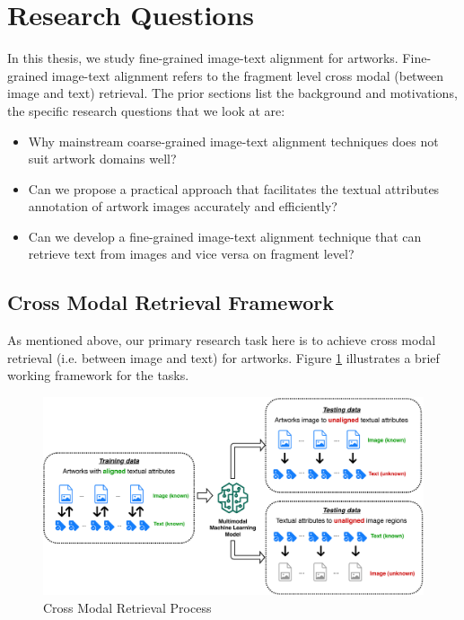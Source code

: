 \section{Research Questions}

In this thesis, we study fine-grained image-text alignment for artworks. Fine-grained image-text alignment refers to the fragment level cross modal (between image and text) retrieval. The prior sections list the background and motivations, the specific research questions that we look at are:

\begin{itemize}
    \item Why mainstream coarse-grained image-text alignment techniques does not suit artwork domains well?
    \item Can we propose a practical approach that facilitates the textual attributes annotation of artwork images accurately and efficiently?
    \item Can we develop a fine-grained image-text alignment technique that can retrieve text from images and vice versa on fragment level?
\end{itemize}

\subsection{Cross Modal Retrieval Framework}

As mentioned above, our primary research task here is to achieve cross modal retrieval (i.e. between image and text) for artworks. Figure \ref{fig:framework} illustrates a brief working framework for the tasks.

\begin{figure}[h!]
\centering
\includegraphics[width=\textwidth]{framework.pdf}
\caption{Cross Modal Retrieval Process}
\label{fig:framework}
\end{figure}

